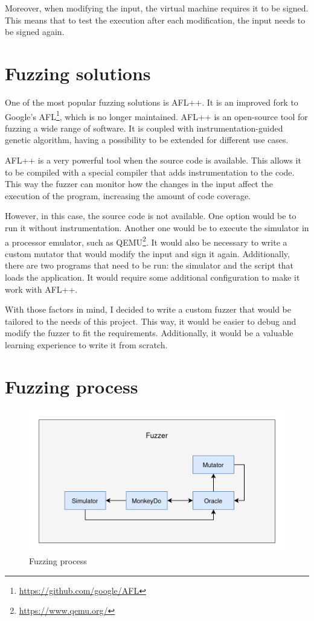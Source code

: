 Moreover, when modifying the input, the virtual machine requires it to be signed.
This means that to test the execution after each modification, the input needs to be signed again.


\section{Fuzzing solutions}
One of the most popular fuzzing solutions is AFL++\cite{aflplusplus}.
It is an improved fork to Google's AFL\footnote{\url{https://github.com/google/AFL}}, which is no longer maintained.
AFL++ is an open-source tool for fuzzing a wide range of software.
It is coupled with instrumentation-guided genetic algorithm, having a possibility to be extended for different use cases.

AFL++ is a very powerful tool when the source code is available.
This allows it to be compiled with a special compiler that adds instrumentation to the code.
This way the fuzzer can monitor how the changes in the input affect the execution of the program, increasing the amount of code coverage.

However, in this case, the source code is not available.
One option would be to run it without instrumentation.
Another one would be to execute the simulator in a processor emulator, such as QEMU\footnote{\url{https://www.qemu.org/}}.
It would also be necessary to write a custom mutator that would modify the input and sign it again.
Additionally, there are two programs that need to be run: the simulator and the script that loads the application.
It would require some additional configuration to make it work with AFL++.

With those factors in mind, I decided to write a custom fuzzer that would be tailored to the needs of this project.
This way, it would be easier to debug and modify the fuzzer to fit the requirements.
Additionally, it would be a valuable learning experience to write it from scratch.


\section{Fuzzing process}
\begin{figure}[h]
    \centering
    \includegraphics[width=0.8\linewidth]{../../images/fuzzer-diagram}
    \caption{Fuzzing process}
    \label{fig:fuzzer-diagram}
\end{figure}

